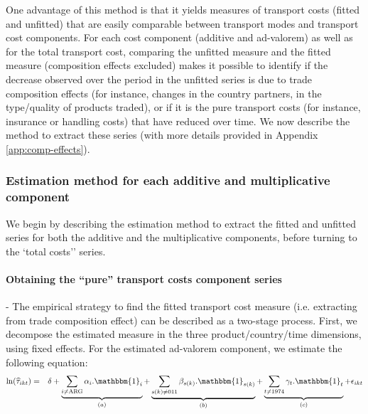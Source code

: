 \documentclass[a4paper,11pt]{article}
\begin{document}
One advantage of this method is that it yields measures of transport costs (fitted and unfitted) that are easily comparable between transport modes and transport cost components.
For each cost component (additive and ad-valorem) as well as for the total transport cost, comparing the unfitted measure and the fitted measure (composition effects excluded) makes it possible to identify if the decrease observed over the period in the unfitted series is due to trade composition effects (for instance, changes in the country partners, in the type/quality of products traded), or if it is the pure transport costs (for instance, insurance or handling costs) that have reduced over time.
We now describe the method to extract these series (with more details provided in Appendix \ref{app:comp-effects}).


\subsubsection{Estimation method for each additive and multiplicative component}

We begin by describing the estimation method to extract the fitted and unfitted series for both the additive and the multiplicative components, before turning to the `total costs'' series.
\smallskip

\paragraph{Obtaining the ``pure'' transport costs component series} - The empirical strategy to find the fitted transport cost measure (i.e. extracting from trade composition effect) can be described as a two-stage process.
First, we decompose the estimated measure in the three product/country/time dimensions, using fixed effects.
For the estimated ad-valorem component, we estimate the following equation:
\begin{eqnarray}
\ln(\widehat{\tau}_{ikt})&=&\delta +\underbrace{\sum_{i \neq \text{ARG}}\alpha_i.\mathbbm{1}_i}_{(a)} + \underbrace{\sum_{s(k)\neq \text{011}}\beta_{s(k)}.\mathbbm{1}_{s(k)}}_{(b)} + \underbrace{\sum_{t \neq 1974}\gamma_t.\mathbbm{1}_t}_{(c)}+\epsilon_{ikt} \label{eq:compeffects_mult}
\end{eqnarray}
\end{document}
